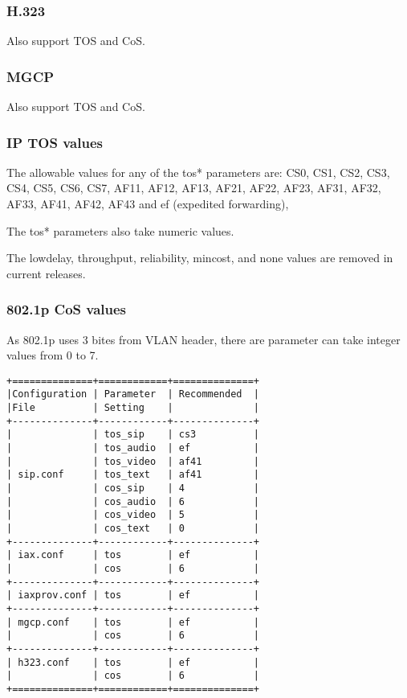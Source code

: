 \subsubsection{H.323}
Also support TOS and CoS. 

\subsubsection{MGCP}
Also support TOS and CoS.

\subsubsection{IP TOS values}

The allowable values for any of the tos* parameters are:
CS0, CS1, CS2, CS3, CS4, CS5, CS6, CS7, AF11, AF12, AF13,
AF21, AF22, AF23, AF31, AF32, AF33, AF41, AF42, AF43 and
ef (expedited forwarding),

The tos* parameters also take numeric values.

The lowdelay, throughput, reliability, mincost, and none values are
removed in current releases.

\subsubsection{802.1p CoS values}

As 802.1p uses 3 bites from VLAN header, there are parameter can take 
integer values from 0 to 7.


\begin{verbatim}
+==============+============+==============+
|Configuration | Parameter  | Recommended  |
|File          | Setting    |              |
+--------------+------------+--------------+
|              | tos_sip    | cs3          |
|              | tos_audio  | ef           |
|              | tos_video  | af41         |
| sip.conf     | tos_text   | af41         |
|              | cos_sip    | 4            |
|              | cos_audio  | 6            |
|              | cos_video  | 5            |
|              | cos_text   | 0            |
+--------------+------------+--------------+
| iax.conf     | tos        | ef           |
|              | cos        | 6            |
+--------------+------------+--------------+
| iaxprov.conf | tos        | ef           |
+--------------+------------+--------------+
| mgcp.conf    | tos        | ef           |
|              | cos        | 6            |
+--------------+------------+--------------+
| h323.conf    | tos        | ef           |
|              | cos        | 6            |
+==============+============+==============+
\end{verbatim}

